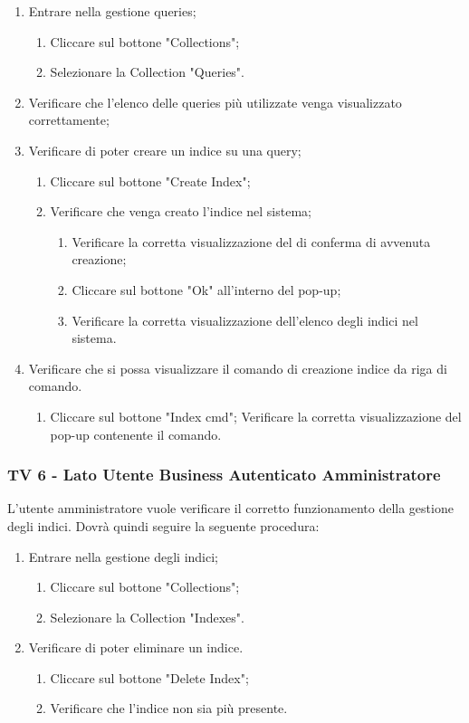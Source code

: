\begin{enumerate}
\item Entrare nella gestione queries;
\begin{enumerate}
\item Cliccare sul bottone "Collections";
\item Selezionare la Collection "Queries".
\end{enumerate}
\item Verificare che l'elenco delle queries più utilizzate venga visualizzato correttamente;
\item Verificare di poter creare un indice su una query;
\begin{enumerate}
\item Cliccare sul bottone "Create Index";
\item Verificare che venga creato l'indice nel sistema;
\begin{enumerate}
\item Verificare la corretta visualizzazione del  di conferma di avvenuta creazione;
\item Cliccare sul bottone "Ok" all'interno del pop-up;
\item Verificare la corretta visualizzazione dell'elenco degli indici nel sistema.
\end{enumerate}
\end{enumerate}
\item Verificare che si possa visualizzare il comando di creazione indice da riga di comando.
\begin{enumerate}
\item Cliccare sul bottone "Index cmd";
Verificare la corretta visualizzazione del pop-up contenente il comando.
\end{enumerate}

\end{enumerate}
\subsubsection{TV 6 - Lato Utente Business Autenticato Amministratore}

L’utente amministratore vuole verificare il corretto funzionamento della gestione degli indici.
Dovrà quindi seguire la seguente procedura:

\begin{enumerate}
\item Entrare nella gestione degli indici;
\begin{enumerate}
\item Cliccare sul bottone "Collections";
\item Selezionare la Collection "Indexes".
\end{enumerate}
\item Verificare di poter eliminare un indice.
\begin{enumerate}
\item Cliccare sul bottone "Delete Index";
\item Verificare che l'indice non sia più presente.
\end{enumerate}
\end{enumerate}

